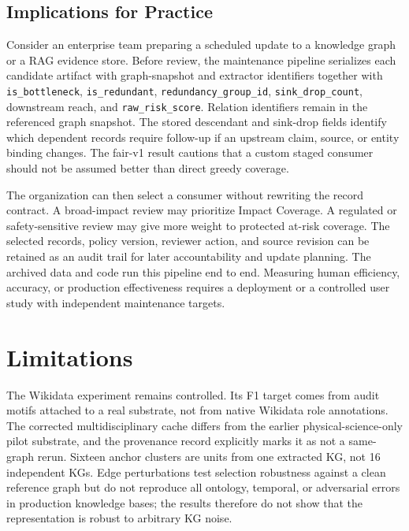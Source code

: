 \documentclass[pdflatex,sn-basic]{sn-jnl}
\begin{document}
\subsection{Implications for Practice}

Consider an enterprise team preparing a scheduled update to a knowledge graph or a RAG evidence store. Before review, the maintenance pipeline serializes each candidate artifact with graph-snapshot and extractor identifiers together with \texttt{is\_bottleneck}, \texttt{is\_redundant}, \texttt{redundancy\_group\_id}, \texttt{sink\_drop\_count}, downstream reach, and \texttt{raw\_risk\_score}. Relation identifiers remain in the referenced graph snapshot. The stored descendant and sink-drop fields identify which dependent records require follow-up if an upstream claim, source, or entity binding changes. The fair-v1 result cautions that a custom staged consumer should not be assumed better than direct greedy coverage.

The organization can then select a consumer without rewriting the record contract. A broad-impact review may prioritize Impact Coverage. A regulated or safety-sensitive review may give more weight to protected at-risk coverage. The selected records, policy version, reviewer action, and source revision can be retained as an audit trail for later accountability and update planning. The archived data and code run this pipeline end to end. Measuring human efficiency, accuracy, or production effectiveness requires a deployment or a controlled user study with independent maintenance targets.

\section{Limitations}
\label{sec:limitations}

The Wikidata experiment remains controlled. Its F1 target comes from audit motifs attached to a real substrate, not from native Wikidata role annotations. The corrected multidisciplinary cache differs from the earlier physical-science-only pilot substrate, and the provenance record explicitly marks it as not a same-graph rerun. Sixteen anchor clusters are units from one extracted KG, not 16 independent KGs. Edge perturbations test selection robustness against a clean reference graph but do not reproduce all ontology, temporal, or adversarial errors in production knowledge bases; the results therefore do not show that the representation is robust to arbitrary KG noise.
\end{document}
